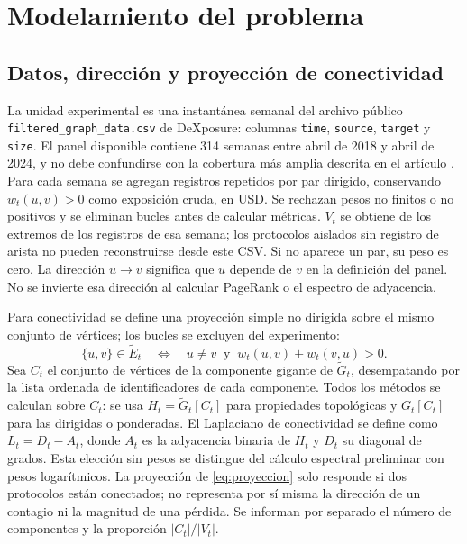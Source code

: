\documentclass[journal]{IEEEtran}
\begin{document}
\section{Modelamiento del problema}

\subsection{Datos, dirección y proyección de conectividad}

La unidad experimental es una instantánea semanal del archivo público
\texttt{filtered\_graph\_data.csv} de DeXposure: columnas \texttt{time},
\texttt{source}, \texttt{target} y \texttt{size}. El panel disponible contiene
314 semanas entre abril de 2018 y abril de 2024, y no debe confundirse con
la cobertura más amplia descrita en el artículo \cite{wu2025dexposure}. Para
cada semana se agregan registros repetidos por par dirigido, conservando
$w_t(u,v)>0$ como exposición cruda, en USD. Se rechazan pesos no finitos o
no positivos y se eliminan bucles antes de calcular métricas. $V_t$ se obtiene
de los extremos de los registros de esa semana; los protocolos aislados sin
registro de arista no pueden reconstruirse desde este CSV. Si no aparece un
par, su peso es cero.
La dirección $u\to v$ significa que $u$ depende de $v$ en la definición del
panel. No se invierte esa dirección al calcular PageRank o el espectro de
adyacencia.

Para conectividad se define una proyección simple no dirigida sobre el mismo
conjunto de vértices; los bucles se excluyen del experimento:
\begin{equation}
\{u,v\}\in\tilde E_t
\quad\Longleftrightarrow\quad
u\ne v\ \text{ y }\ w_t(u,v)+w_t(v,u)>0.
\label{eq:proyeccion}
\end{equation}
Sea $C_t$ el conjunto de vértices de la componente gigante de $\tilde G_t$,
desempatando por la lista ordenada de identificadores de cada componente.
Todos los métodos se calculan sobre $C_t$: se usa $H_t=\tilde G_t[C_t]$
para propiedades topológicas y $G_t[C_t]$ para las dirigidas o ponderadas.
El Laplaciano de conectividad se define como $L_t=D_t-A_t$, donde $A_t$ es
la adyacencia binaria de $H_t$ y $D_t$ su diagonal de grados. Esta elección
sin pesos se distingue del cálculo espectral preliminar con pesos logarítmicos.
La proyección de
\eqref{eq:proyeccion} solo responde si dos protocolos están conectados; no
representa por sí misma la dirección de un contagio ni la magnitud de una
pérdida. Se informan por separado el número de componentes y la proporción
$|C_t|/|V_t|$.
\end{document}
